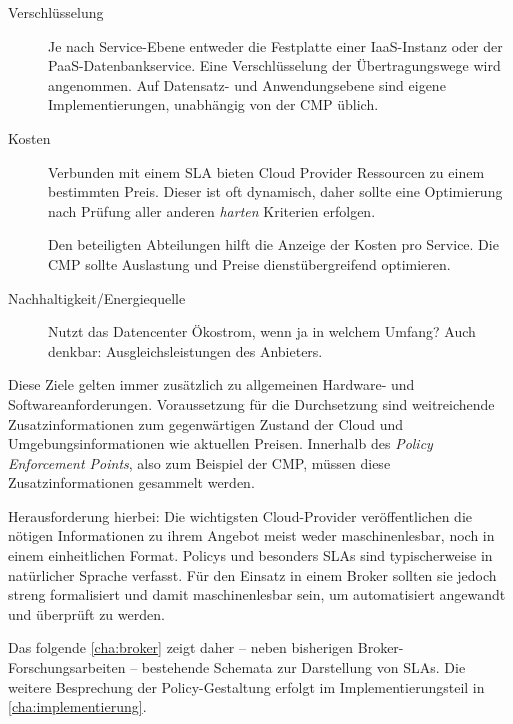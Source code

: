 \begin{description}
	\item[Verschlüsselung] Je nach Service-Ebene entweder die Festplatte einer IaaS-Instanz oder der PaaS-Datenbankservice. Eine Verschlüsselung der Übertragungswege wird angenommen. Auf Datensatz- und Anwendungsebene sind eigene Implementierungen, unabhängig von der CMP üblich.
	
	\item[Kosten] Verbunden mit einem SLA bieten Cloud Provider Ressourcen zu einem bestimmten Preis. Dieser ist oft dynamisch, daher sollte eine Optimierung nach Prüfung aller anderen \emph{harten} Kriterien erfolgen.
	
	Den beteiligten Abteilungen hilft die Anzeige der Kosten pro Service. Die CMP sollte Auslastung und Preise dienstübergreifend optimieren.
	 	
	\item[Nachhaltigkeit/Energiequelle] Nutzt das Datencenter Ökostrom, wenn ja in welchem Umfang? Auch denkbar: Ausgleichsleistungen des Anbieters.
	
	
\end{description}

\noindent 
Diese Ziele gelten immer zusätzlich zu allgemeinen Hardware- und Softwareanforderungen. Voraussetzung für die Durchsetzung sind weitreichende Zusatzinformationen zum gegenwärtigen Zustand der Cloud und Umgebungsinformationen wie aktuellen Preisen. Innerhalb des \emph{Policy Enforcement Points}, also zum Beispiel der CMP, müssen diese Zusatzinformationen gesammelt werden.

Herausforderung hierbei: Die wichtigsten Cloud-Provider veröffentlichen die nötigen Informationen zu ihrem Angebot meist weder maschinenlesbar, noch in einem einheitlichen Format.
Policys und besonders SLAs sind typischerweise in natürlicher Sprache verfasst. Für den Einsatz in einem Broker sollten sie jedoch streng formalisiert und damit maschinenlesbar sein, um automatisiert angewandt und überprüft zu werden.

Das folgende \autoref{cha:broker} zeigt daher -- neben bisherigen Broker-Forschungsarbeiten -- bestehende Schemata zur Darstellung von SLAs. Die weitere Besprechung der Policy-Gestaltung erfolgt im Implementierungsteil in \autoref{cha:implementierung}.